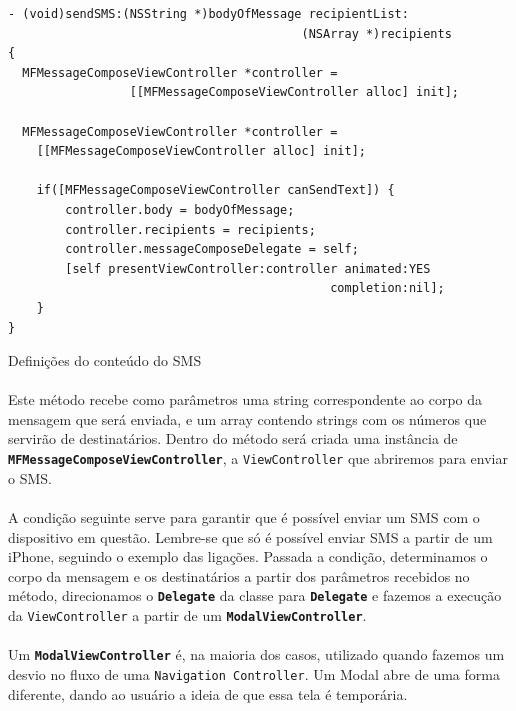 \documentclass[a4paper,12pt,brazil,doubleside]{book}
\begin{document}
\begin{singlespace}
\begin{listing}[H]
\begin{verbatim}
- (void)sendSMS:(NSString *)bodyOfMessage recipientList:
                                         (NSArray *)recipients
{
  MFMessageComposeViewController *controller =
                 [[MFMessageComposeViewController alloc] init];

  MFMessageComposeViewController *controller =
    [[MFMessageComposeViewController alloc] init];
    
    if([MFMessageComposeViewController canSendText]) {
        controller.body = bodyOfMessage;
        controller.recipients = recipients;
        controller.messageComposeDelegate = self;
        [self presentViewController:controller animated:YES
                                             completion:nil];
    }
}
\end{verbatim}
\caption{Definições do conteúdo do SMS}
\end{listing}

\paragraph{}Este método recebe como parâmetros uma string correspondente ao corpo da mensagem que será enviada, e um array contendo strings com os números que servirão de destinatários. Dentro do método será criada uma instância de \texttt{\textbf{MFMessageComposeViewController}}, a \texttt{ViewController} que abriremos para enviar o SMS.
\paragraph{}A condição seguinte serve para garantir que é possível enviar um SMS com o dispositivo em questão. Lembre-se que só é possível enviar SMS a partir de um iPhone, seguindo o exemplo das ligações. Passada a condição, determinamos o corpo da mensagem e os destinatários a partir dos parâmetros recebidos no método, direcionamos o \texttt{\textbf{Delegate}} da classe para \texttt{\textbf{Delegate}} e fazemos a execução da \texttt{ViewController} a partir de um \texttt{\textbf{ModalViewController}}.
\paragraph{}Um \texttt{\textbf{ModalViewController}} é, na maioria dos casos, utilizado quando fazemos um desvio no fluxo de uma \texttt{Navigation Controller}. Um Modal abre de uma forma diferente, dando ao usuário a ideia de que essa tela é temporária.

\end{singlespace}
\end{document}
